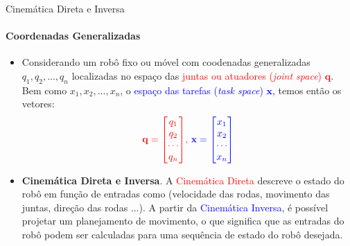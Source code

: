 \documentclass[aspectratio=169]{beamer}
\begin{document}
\begin{frame}{Cinemática Direta e Inversa}
    \framesubtitle{Coordenadas Generalizadas}
    \begin{itemize}
        \item Considerando um robô fixo ou móvel com coodenadas generalizadas $q_1, q_2,..., q_n$ localizadas no espaço das \textcolor{red}{juntas ou atuadores (\textit{joint space}) $\mathbf{q}$}. Bem como $x_1, x_2,..., x_n$, o \textcolor{blue}{espaço das tarefas (\textit{task space}) $\mathbf{x}$}, temos então os vetores:
             \begin{equation*}
                \color{red}{
                  \mathbf{q} =
                  \begin{bmatrix}
                      q_1 \\q_2 \\ \cdots  \\ q_n
                  \end{bmatrix}
                }
                  \text{, }
                \color{blue}{
                  \mathbf{x} =
                  \begin{bmatrix}
                      x_1 \\x_2 \\ \cdots \\ x_n
                  \end{bmatrix}
                }
              \end{equation*}

        \item \textbf{Cinemática Direta e Inversa}. A \textcolor{red}{Cinemática Direta} descreve o estado do robô em função de entradas como (velocidade das rodas, movimento das juntas, direção das rodas ...).  A partir da \textcolor{blue}{Cinemática Inversa}, é possível projetar um planejamento de movimento, o que significa que as entradas do robô podem ser calculadas para uma sequência de estado do robô desejada.

    \end{itemize}
\end{frame}
\end{document}
